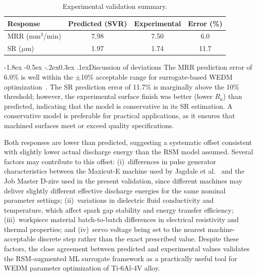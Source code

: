 \documentclass[12pt, a4paper]{report}
\makeatletter
\renewcommand{\section}{\@startsection{section}{1}{\z@}%
  {-1.8ex \@plus -0.5ex \@minus -.2ex}{0.3ex \@plus.1ex}{\normalfont\bfseries}}
\makeatother
\begin{document}
\begin{table}[!htbp]
\centering
\caption{Experimental validation summary.}
\label{tab:validation}
\begin{tabular}{|l|c|c|c|}
\hline
\textbf{Response} & \textbf{Predicted (SVR)} & \textbf{Experimental} & \textbf{Error (\%)} \\ \hline
MRR (mm$^3$/min) & 7.98 & 7.50 & 6.0 \\ \hline
SR ($\mu$m) & 1.97 & 1.74 & 11.7 \\ \hline
\end{tabular}
\end{table}

\section{Discussion of deviations}
The MRR prediction error of 6.0\% is well within the $\pm$10\% acceptable range for surrogate-based WEDM optimization~\cite{Devarasiddappa2018}. The SR prediction error of 11.7\% is marginally above the 10\% threshold; however, the experimental surface finish was better (lower $R_a$) than predicted, indicating that the model is conservative in its SR estimation. A conservative model is preferable for practical applications, as it ensures that machined surfaces meet or exceed quality specifications.

Both responses are lower than predicted, suggesting a systematic offset consistent with slightly lower actual discharge energy than the RSM model assumed. Several factors may contribute to this offset: (i)~differences in pulse generator characteristics between the Maxicut-E machine used by Jagdale et al.~\cite{Jagdale2025} and the Job Master D-zire used in the present validation, since different machines may deliver slightly different effective discharge energies for the same nominal parameter settings; (ii)~variations in dielectric fluid conductivity and temperature, which affect spark gap stability and energy transfer efficiency; (iii)~workpiece material batch-to-batch differences in electrical resistivity and thermal properties; and (iv)~servo voltage being set to the nearest machine-acceptable discrete step rather than the exact prescribed value. Despite these factors, the close agreement between predicted and experimental values validates the RSM-augmented ML surrogate framework as a practically useful tool for WEDM parameter optimization of Ti-6Al-4V alloy.


\end{document}
